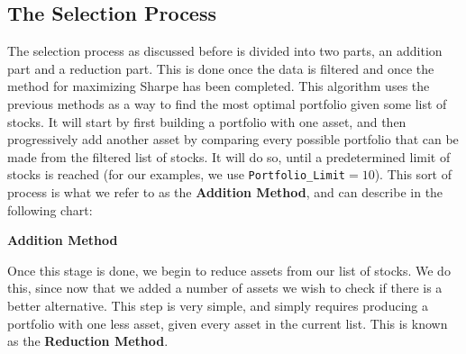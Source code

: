 \documentclass[12pt,titlepage,a4paper]{article}
\begin{document}
	\subsection{The Selection Process}
		The selection process as discussed before is divided into two parts, an addition part and a reduction part. This is done once the data is filtered and once the method for maximizing Sharpe has been completed. This algorithm uses the previous methods as a way to find the most optimal portfolio given some list of stocks. It will start by first building a portfolio with one asset, and then progressively add another asset by comparing every possible portfolio that can be made from the filtered list of stocks. It will do so, until a predetermined limit of stocks is reached (for our examples, we use \verb|Portfolio_Limit|$=10$). This sort of process is what we refer to as the \textbf{Addition Method}, and can describe in the following chart:\\
		\newpage
		\begin{center}
		\textbf{Addition Method}\par
		\end{center}
		Once this stage is done, we begin to reduce assets from our list of stocks. We do this, since now that we added a number of assets we wish to check if there is a better alternative. This step is very simple, and simply requires producing a portfolio with one less asset, given every asset in the current list. This is known as the \textbf{Reduction Method}. 
\end{document}
